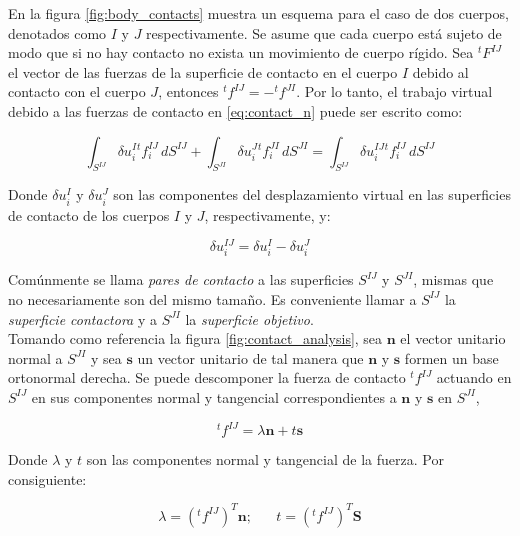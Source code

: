 En la figura \ref{fig:body_contacts} muestra un esquema para el caso de dos cuerpos, 
denotados como $I$ y $J$ respectivamente. Se asume que cada cuerpo está sujeto de
modo que si no hay contacto no exista un movimiento de cuerpo rígido. Sea $^tF^{IJ}$ 
el vector de las fuerzas de la superficie de contacto en el cuerpo $I$ debido 
al contacto con el cuerpo $J$, entonces $^tf^{IJ} = -^tf^{JI}$. Por lo tanto, 
el trabajo virtual debido a las fuerzas de contacto en \ref{eq:contact_n} puede 
ser escrito como:

\begin{equation}
\int_{S^{IJ}} \delta u_i^I ^tf_i^{IJ} \, dS^{IJ} + 
\int_{S^{JI}} \delta u_i^J ^tf_i^{JI} \, dS^{JI} = 
\int_{S^{IJ}} \delta u_i^{IJ} ^tf_i^{IJ} \, dS^{IJ}
\end{equation}

Donde $\delta u_i^I$ y $\delta u_i^J$ son las componentes del desplazamiento virtual en 
las superficies de contacto de los cuerpos $I$ y $J$, respectivamente, y:

\begin{equation}
\delta u_i^{IJ} = \delta u_i^I - \delta u_i^J
\end{equation}

Comúnmente se llama \textit{pares de contacto} a las superficies $S^{IJ}$ y $S^{JI}$, mismas 
que no necesariamente son del mismo tamaño. Es conveniente llamar a $S^{IJ}$ la 
\textit{superficie contactora} y a $S^{JI}$ la \textit{superficie objetivo}.\\

Tomando como referencia la figura \ref{fig:contact_analysis}, sea $\bm{n}$ el vector unitario 
normal a $S^{JI}$ y sea $\bm{s}$ un vector unitario de tal manera que $\bm{n}$ y $\bm{s}$ formen un base 
ortonormal derecha. Se puede descomponer la fuerza de contacto $^tf^{IJ}$ actuando en $S^{IJ}$ en 
sus componentes normal y tangencial correspondientes a $\bm{n}$ y $\bm{s}$ en $S^{JI}$,

\begin{equation}
^tf^{IJ} = \lambda \bm{n} + t \bm{s}
\end{equation}

Donde $\lambda$ y $t$ son las componentes normal y tangencial de la fuerza. Por consiguiente:

\begin{equation}
\lambda = \left( ^tf^{IJ} \right)^T \bm{n}; \,\,\,\,\,\,\,\,\,\, t = \left( ^tf^{IJ} \right)^T \bm{S}
\end{equation}


